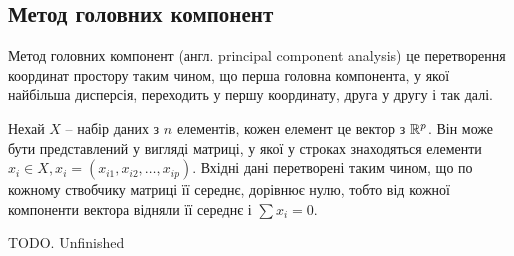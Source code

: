 
\subsection{Метод головних компонент}


Метод головних компонент (англ. principal component analysis) це перетворення координат простору таким чином, що перша головна компонента, у якої найбільша дисперсія, переходить у першу координату, друга у другу і так далі.

Нехай $X$ -- набір даних з $n$ елементів, кожен елемент це вектор з $\Bbb R^p$. Він може бути представлений у вигляді матриці, у якої у строках знаходяться елементи $x_i \in X, x_i = (x_{i1}, x_{i2}, \dots, x_{ip})$. Вхідні дані перетворені таким чином, що по кожному ствобчику матриці її середнє,  дорівнює нулю, тобто від кожної компоненти вектора відняли її середнє і $\sum x_i  = 0$.

TODO. Unfinished

% 
% 
% 
% 
% 
% 

